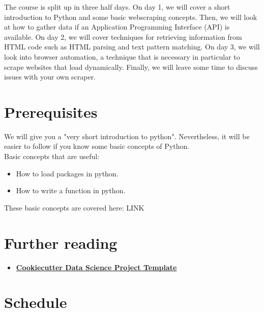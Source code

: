 \documentclass[a4paper]{article}
\begin{document}
The course is split up in three half days. On day 1, we will cover a short introduction to Python and some basic webscraping concepts. Then, we will look at how to gather data if an Application Programming Interface (API) is available. On day 2, we will cover techniques for retrieving information from HTML code such as HTML parsing and text pattern matching. On day 3, we will look into browser automation, a technique that is necessary in particular to scrape websites that load dynamically. Finally, we will leave some time to discuss issues with your own scraper.

\section{Prerequisites}

We will give you a "very short introduction to python". Nevertheless,
it will be easier to follow if you know some basic concepts of Python.\\

Basic concepts that are useful:
\begin{itemize}
    \item How to load packages in python.
    \item How to write a function in python.
\end{itemize}

These basic concepts are covered here:
LINK

\section{Further reading}

\begin{itemize}
    \item{
      \href{
        http://drivendata.github.io/cookiecutter-data-science/}{
        \textbf{Cookiecutter Data Science Project Template}}}
\end{itemize}

\section{Schedule}
\end{document}
